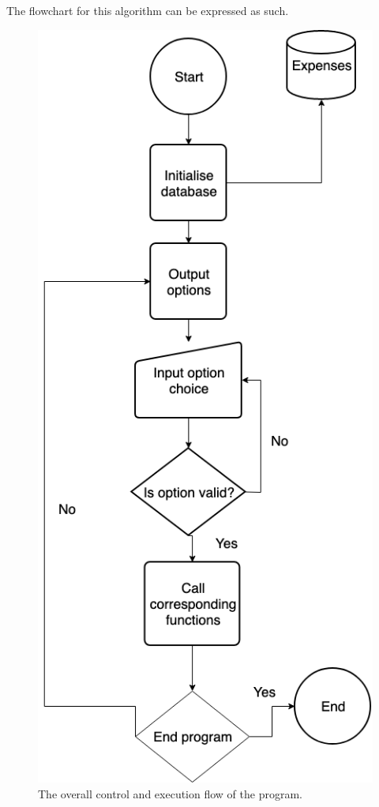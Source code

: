 \documentclass[11pt]{article}
\begin{document}
  The flowchart for this algorithm can be expressed as such.
    \begin{figure}[H]
      \centering
      \includegraphics[scale=0.4]{overall_program_flow.png}
      \caption{The overall control and execution flow of the program.}
    \end{figure}
\end{document}
